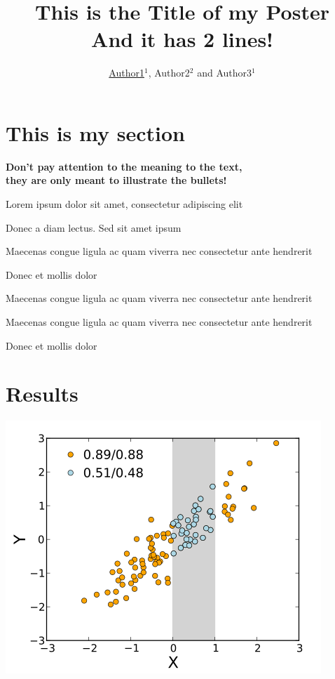 \documentclass[a0, 30pt]{sciposter}
\title{This is the Title of my Poster \\ And it has 2 lines!}
\author{\underline{Author1}$^1$, Author2$^2$ and Author3$^1$}
\begin{document}

\maketitle


\begin{multicols}{2}
  
  \section{This is my section}
  
  \usualsep
  \begin{center}
    \bf \color{blue} Don't pay attention to the meaning to the text, \\ they are
    only meant to illustrate the bullets!
  \end{center}
  
  \usualsep
   Lorem ipsum dolor sit amet, consectetur adipiscing elit
  
  \usualsep 
   Donec a diam lectus. Sed sit amet ipsum
  
  \usualsep
   Maecenas congue ligula ac quam viverra nec consectetur ante
  hendrerit 
  
  \usualsep
   Donec et mollis dolor
  
  \usualsep
   Maecenas congue ligula ac quam viverra nec consectetur ante
  hendrerit
  
  \usualsep
   Maecenas congue ligula ac quam viverra nec consectetur ante
  hendrerit
  
  \usualsep
   Donec et mollis dolor
  
  \section{Results}
  
  \begin{center}
    \includegraphics[scale = 1.0]{example.png}
  \end{center}
  

\end{multicols}
\end{document}
